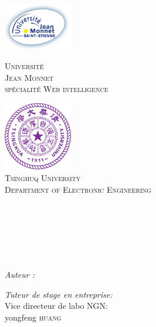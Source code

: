 
\begin{titlepage}

\begin{center}

\begin{minipage}[t]{0.48\textwidth}
  \begin{flushleft}
    \includegraphics [width=30mm]{images/logo-univ.png} \\[0.3cm]
    \begin{spacing}{1.1}
      \textsc{\LARGE Université\\ Jean Monnet \\ \large spécialité Web intelligence}
    \end{spacing}
  \end{flushleft}
\end{minipage}
\begin{minipage}[t]{0.5\textwidth}
  \begin{flushright}
    \includegraphics [width=30mm]{images/Tsinghua_University_Logo.png} \\[0.5cm]
    \textsc{\LARGE Tsinghuq University\\ \large Department of Electronic Engineering}
  \end{flushright}
\end{minipage}\\ [3.5ex]

\textsc{\Large \reportsubject}\\[0.1ex]
\HRule \\[0.4cm]
{\huge \bfseries \reporttitle}\\[0.2ex]
\HRule \\[10.5ex]

\begin{minipage}[t]{0.3\textwidth}
  \begin{flushleft} \large
    \emph{Auteur :}\\
    \reportauthor
  \end{flushleft}
\end{minipage}
\begin{minipage}[t]{0.6\textwidth}
  \begin{flushright} \large
    \emph{Tuteur de stage en entreprise:} \\
    Vice directeur de labo NGN:\\ yongfeng \textsc{huang} \\
    

\end{flushright}
\end{minipage}
\end{center}
\end{titlepage}
